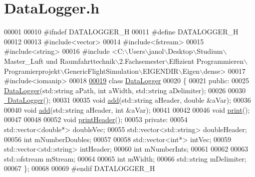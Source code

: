 \hypertarget{_data_logger_8h_source}{}\section{Data\+Logger.\+h}
\label{_data_logger_8h_source}

\begin{DoxyCode}
00001 
00010 \textcolor{preprocessor}{#ifndef DATALOGGER\_H}
00011 \textcolor{preprocessor}{#define DATALOGGER\_H}
00012 
00013 \textcolor{preprocessor}{#include<vector>}
00014 \textcolor{preprocessor}{#include<fstream>}
00015 \textcolor{preprocessor}{#include<string>}
00016 \textcolor{preprocessor}{#include <C:\(\backslash\)Users\(\backslash\)janol\(\backslash\)Desktop\(\backslash\)Studium\(\backslash\)Master\_Luft und Raumfahrttechnik\(\backslash\)2.Fachsemester\(\backslash\)Effizient
       Programmieren\(\backslash\)Programierprojekt\(\backslash\)GenericFlightSimulation\(\backslash\)EIGENDIR\(\backslash\)Eigen\(\backslash\)dense>}
00017 \textcolor{preprocessor}{#include<iomanip>}
00018 
\hyperlink{group___tools}{00019} \textcolor{keyword}{class }\hyperlink{group___tools_class_data_logger}{DataLogger}
00020 \{
00021 \textcolor{keyword}{public}:
00025     \hyperlink{group___tools_aa95dc52c00e81fcb074ef4224d305238}{DataLogger}(std::string aPath, \textcolor{keywordtype}{int} aWidth, std::string aDelimiter);
00026 
00030     \hyperlink{group___tools_a9aaff109f3e7749a0a0a0313655da50a}{~DataLogger}();
00031 
00035     \textcolor{keywordtype}{void} \hyperlink{group___tools_a31d8ed8cfdda531f19236e214d5d931f}{add}(std::string aHeader, \textcolor{keywordtype}{double} &aVar);
00036 
00040     \textcolor{keywordtype}{void} \hyperlink{group___tools_a31d8ed8cfdda531f19236e214d5d931f}{add}(std::string aHeader, \textcolor{keywordtype}{int} &aVar);  
00041 
00042 
00046     \textcolor{keywordtype}{void} \hyperlink{group___tools_aa1bd66fc07169787398f386d9276708b}{print}();
00047 
00048 
00052     \textcolor{keywordtype}{void} \hyperlink{group___tools_ad7247b2350411b48f323de6c91e8479c}{printHeader}();
00053 \textcolor{keyword}{private}:
00054     std::vector<double*> doubleVec;
00055     std::vector<std::string> doubleHeader;
00056     \textcolor{keywordtype}{int} mNumberDoubles;
00057 
00058     std::vector<int*> intVec;
00059     std::vector<std::string> intHeader;
00060     \textcolor{keywordtype}{int} mNumberInts;
00061 
00062 
00063     std::ofstream mStream;
00064 
00065     \textcolor{keywordtype}{int} mWidth;
00066     std::string mDelimiter;
00067 \};
00068 
00069 \textcolor{preprocessor}{#endif DATALOGGER\_H}
\end{DoxyCode}
